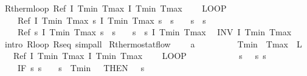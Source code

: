 \documentclass[envcountsame]{llncs}
\begin{document}
\begin{example}
\begin{isabellebody}
\isanewline
{}\isamarkupfalse%
\ R{\isacharunderscore}therm{\isacharunderscore}loop{\isacharcolon}\ {\isachardoublequoteopen}Ref\ {\isasymlceil}I\ Tmin\ Tmax{\isasymrceil}\ {\isasymlceil}I\ Tmin\ Tmax{\isasymrceil}\ {\isasymge}\ \isanewline
\ \ {\isacharparenleft}LOOP\ \isanewline
\ \ \ \ Ref\ {\isasymlceil}I\ Tmin\ Tmax{\isasymrceil}\ {\isasymlceil}{\isasymlambda}s{\isachardot}\ I\ Tmin\ Tmax\ s\ {\isasymand}\ s{\isachardollar}{}\ {\isacharequal}\ {}\ {\isasymand}\ s{\isachardollar}{}\ {\isacharequal}\ s{\isachardollar}{}{\isasymrceil}{\isacharsemicolon}\isanewline
\ \ \ \ Ref\ {\isasymlceil}{\isasymlambda}s{\isachardot}\ I\ Tmin\ Tmax\ s\ {\isasymand}\ s{\isachardollar}{}\ {\isacharequal}\ {}\ {\isasymand}\ s{\isachardollar}{}\ {\isacharequal}\ s{\isachardollar}{}{\isasymrceil}\ {\isasymlceil}I\ Tmin\ Tmax{\isasymrceil}\isanewline
\ \ INV\ I\ Tmin\ Tmax{\isacharparenright}{\isachardoublequoteclose}\isanewline
{}\isamarkupfalse%
\ {\isacharparenleft}intro\ R{\isacharunderscore}loop\ R{\isacharunderscore}seq{\isacharcomma}\ simp{\isacharunderscore}all{\isacharparenright}%
\isanewline
{}\isamarkupfalse%
\ R{\isacharunderscore}thermostat{\isacharunderscore}flow{\isacharcolon}\ \isanewline
\ \ \ {\isachardoublequoteopen}a\ {\isachargreater}\ {}{\isachardoublequoteclose}\ \ {\isachardoublequoteopen}{}\ {\isasymle}\ {\isasymtau}{\isachardoublequoteclose}\ \ {\isachardoublequoteopen}{}\ {\isacharless}\ Tmin{\isachardoublequoteclose}\ \ {\isachardoublequoteopen}Tmax\ {\isacharless}\ L{\isachardoublequoteclose}\isanewline
\ \ \ {\isachardoublequoteopen}Ref\ {\isasymlceil}I\ Tmin\ Tmax{\isasymrceil}\ {\isasymlceil}I\ Tmin\ Tmax{\isasymrceil}\ {\isasymge}\ \isanewline
\ \ {\isacharparenleft}LOOP\ {\isacharparenleft}\isanewline
\ \ \ \ %
\isanewline
\ \ \ \ {\isacharparenleft}{}\ {\isacharcolon}{\isacharcolon}{\isacharequal}\ {\isacharparenleft}{\isasymlambda}s{\isachardot}\ {}{\isacharparenright}{\isacharparenright}{\isacharsemicolon}{\isacharparenleft}{}\ {\isacharcolon}{\isacharcolon}{\isacharequal}\ {\isacharparenleft}{\isasymlambda}s{\isachardot}\ s{\isachardollar}{}{\isacharparenright}{\isacharparenright}{\isacharsemicolon}\isanewline
\ \ \ \ {\isacharparenleft}IF\ {\isacharparenleft}{\isasymlambda}s{\isachardot}\ s{\isachardollar}{}\ {\isacharequal}\ {}\ {\isasymand}\ s{\isachardollar}{}\ {\isasymle}\ Tmin\ {\isacharplus}\ {}{\isacharparenright}\ THEN\ {\isacharparenleft}{}\ {\isacharcolon}{\isacharcolon}{\isacharequal}\ {\isacharparenleft}{\isasymlambda}s{\isachardot}{}{\isacharparenright}{\isacharparenright}\ \isanewline

\end{isabellebody}
\end{example}
\end{document}
